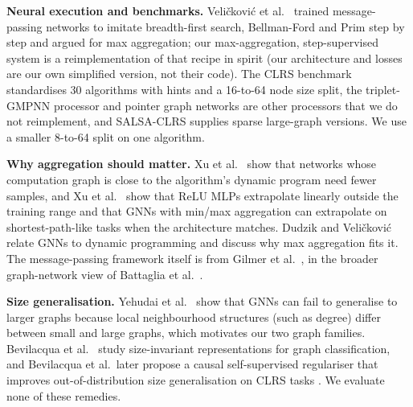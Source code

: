 \textbf{Neural execution and benchmarks.} Veli\v{c}kovi\'c et al.\ \cite{velikovi2019neural} trained message-passing networks to imitate breadth-first search, Bellman-Ford and Prim step by step and argued for max aggregation; our max-aggregation, step-supervised system is a reimplementation of that recipe in spirit (our architecture and losses are our own simplified version, not their code). The CLRS benchmark \cite{velikovi2022clrs} standardises 30 algorithms with hints and a 16-to-64 node size split, the triplet-GMPNN processor \cite{ibarz2022generalist} and pointer graph networks \cite{velikovi2020pointer} are other processors that we do not reimplement, and SALSA-CLRS \cite{minder2023salsa} supplies sparse large-graph versions. We use a smaller 8-to-64 split on one algorithm.

\textbf{Why aggregation should matter.} Xu et al.\ \cite{xu2019what} show that networks whose computation graph is close to the algorithm's dynamic program need fewer samples, and Xu et al.\ \cite{xu2020how} show that ReLU MLPs extrapolate linearly outside the training range and that GNNs with min/max aggregation can extrapolate on shortest-path-like tasks when the architecture matches. Dudzik and Veli\v{c}kovi\'c \cite{dudzik2022graph} relate GNNs to dynamic programming and discuss why max aggregation fits it. The message-passing framework itself is from Gilmer et al.\ \cite{gilmer2017neural}, in the broader graph-network view of Battaglia et al.\ \cite{battaglia2018relational}.

\textbf{Size generalisation.} Yehudai et al.\ \cite{yehudai2020from} show that GNNs can fail to generalise to larger graphs because local neighbourhood structures (such as degree) differ between small and large graphs, which motivates our two graph families. Bevilacqua et al.\ \cite{bevilacqua2021size} study size-invariant representations for graph classification, and Bevilacqua et al.\ later propose a causal self-supervised regulariser that improves out-of-distribution size generalisation on CLRS tasks \cite{bevilacqua2023neural}. We evaluate none of these remedies.
